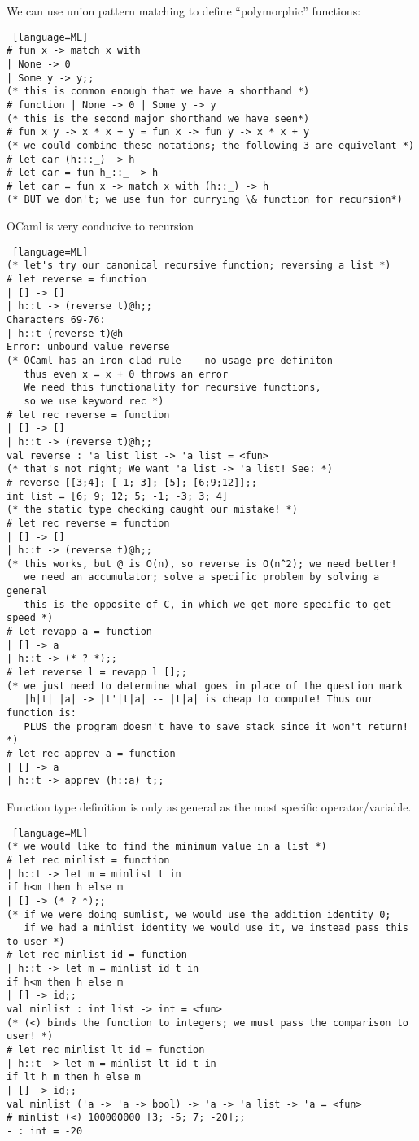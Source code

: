 \documentclass[../../lecture_notes.tex]{subfiles}
\begin{document}
\noindent We can use union pattern matching to define “polymorphic” functions:
\begin{lstlisting} [language=ML]
# fun x -> match x with
| None -> 0
| Some y -> y;;
(* this is common enough that we have a shorthand *)
# function | None -> 0 | Some y -> y
(* this is the second major shorthand we have seen*)
# fun x y -> x * x + y = fun x -> fun y -> x * x + y
(* we could combine these notations; the following 3 are equivelant *)
# let car (h:::_) -> h
# let car = fun h_::_ -> h
# let car = fun x -> match x with (h::_) -> h
(* BUT we don't; we use fun for currying \& function for recursion*)
\end{lstlisting} \medskip

\noindent OCaml is very conducive to recursion
\begin{lstlisting} [language=ML]
(* let's try our canonical recursive function; reversing a list *)
# let reverse = function 
| [] -> []
| h::t -> (reverse t)@h;;
Characters 69-76:
| h::t (reverse t)@h
Error: unbound value reverse
(* OCaml has an iron-clad rule -- no usage pre-definiton
   thus even x = x + 0 throws an error 
   We need this functionality for recursive functions, 
   so we use keyword rec *)
# let rec reverse = function
| [] -> []
| h::t -> (reverse t)@h;;
val reverse : 'a list list -> 'a list = <fun>
(* that's not right; We want 'a list -> 'a list! See: *)
# reverse [[3;4]; [-1;-3]; [5]; [6;9;12]];;
int list = [6; 9; 12; 5; -1; -3; 3; 4]
(* the static type checking caught our mistake! *)
# let rec reverse = function
| [] -> []
| h::t -> (reverse t)@h;;
(* this works, but @ is O(n), so reverse is O(n^2); we need better! 
   we need an accumulator; solve a specific problem by solving a general
   this is the opposite of C, in which we get more specific to get speed *)
# let revapp a = function
| [] -> a
| h::t -> (* ? *);;
# let reverse l = revapp l [];;
(* we just need to determine what goes in place of the question mark
   |h|t| |a| -> |t'|t|a| -- |t|a| is cheap to compute! Thus our function is: 
   PLUS the program doesn't have to save stack since it won't return! *)
# let rec apprev a = function
| [] -> a
| h::t -> apprev (h::a) t;;
\end{lstlisting} \medskip

\noindent Function type definition is only as general as the most specific operator/variable.
\begin{lstlisting} [language=ML]
(* we would like to find the minimum value in a list *)
# let rec minlist = function 
| h::t -> let m = minlist t in
if h<m then h else m
| [] -> (* ? *);;
(* if we were doing sumlist, we would use the addition identity 0;
   if we had a minlist identity we would use it, we instead pass this to user *)
# let rec minlist id = function
| h::t -> let m = minlist id t in
if h<m then h else m
| [] -> id;;
val minlist : int list -> int = <fun>
(* (<) binds the function to integers; we must pass the comparison to user! *)
# let rec minlist lt id = function
| h::t -> let m = minlist lt id t in
if lt h m then h else m
| [] -> id;;
val minlist ('a -> 'a -> bool) -> 'a -> 'a list -> 'a = <fun>
# minlist (<) 100000000 [3; -5; 7; -20];;
- : int = -20
\end{lstlisting}
\end{document}
